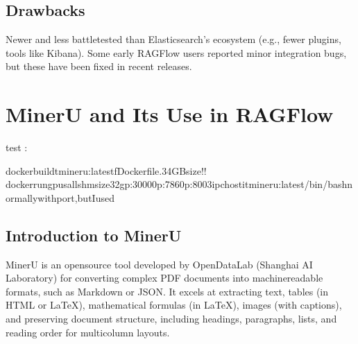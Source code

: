 \documentclass[letterpaper,10pt,english]{sphinxmanual}
\begin{document}
\section{Drawbacks}
\label{\detokenize{infinity:drawbacks}}
\sphinxAtStartPar
Newer and less battle\sphinxhyphen{}tested than Elasticsearch’s ecosystem (e.g., fewer plugins, tools like Kibana). Some early RAGFlow users reported minor integration bugs, but these have been fixed in recent releases.

\sphinxstepscope


\chapter{MinerU and Its Use in RAGFlow}
\label{\detokenize{minerU:mineru-and-its-use-in-ragflow}}\label{\detokenize{minerU::doc}}
\sphinxAtStartPar
test : 

\begin{sphinxVerbatim}[commandchars=\\\{\}]
dockerbuild\PYGZhy{}tmineru:latest\PYGZhy{}fDockerfile.34GBsize!!
dockerrun\PYGZhy{}\PYGZhy{}gpusall\PYGZhy{}\PYGZhy{}shm\PYGZhy{}size32g\PYGZhy{}p:30000\PYGZhy{}p:7860\PYGZhy{}p:8003\PYGZhy{}\PYGZhy{}ipchost\PYGZhy{}itmineru:latest/bin/bashnormallywithport,butIused
\end{sphinxVerbatim}


\section{Introduction to MinerU}
\label{\detokenize{minerU:introduction-to-mineru}}
\sphinxAtStartPar
MinerU is an open\sphinxhyphen{}source tool developed by OpenDataLab (Shanghai AI
Laboratory) for converting complex PDF documents into machine\sphinxhyphen{}readable
formats, such as Markdown or JSON. It excels at extracting text, tables
(in HTML or LaTeX), mathematical formulas (in LaTeX), images (with
captions), and preserving document structure, including headings,
paragraphs, lists, and reading order for multi\sphinxhyphen{}column layouts.
\end{document}
